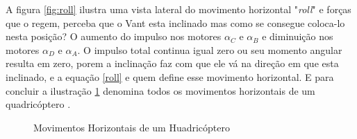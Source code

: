 A figura \ref{fig:roll} ilustra uma vista lateral do movimento horizontal "\textit{roll}" e forças que o regem, perceba que o Vant esta inclinado mas como se consegue coloca-lo nesta posição? O aumento do impulso nos motores $\alpha_{C}$ e $\alpha_{B}$ e diminuição nos motores $\alpha_{D}$ e $\alpha_{A}$. O impulso total continua igual zero ou seu momento angular resulta em zero, porem a inclinação faz com que ele vá na direção em que esta inclinado, e a equação \ref{roll} e quem define esse movimento horizontal.
E para concluir a ilustração \ref{fig:dirdrone} denomina todos os movimentos horizontais de um quadricóptero \cite{calcmov}.  

\begin{figure}[H]
	\centering
	\caption{Movimentos Horizontais de um Huadricóptero}
	\fontsize{9pt}{12pt}\selectfont
	\def\svgwidth{15cm}
	
	\label{fig:dirdrone}
\end{figure}